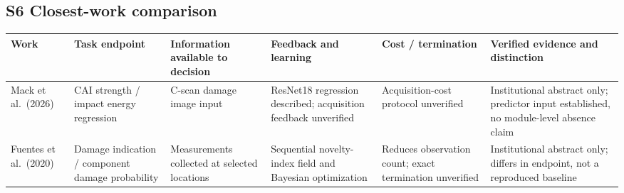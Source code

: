 \documentclass[11pt,a4paper]{article}
\begin{document}
\subsection{S6 Closest-work comparison}\label{s6-closest-work-comparison}

{ %
\begin{longtable}[]{@{}
  >{\raggedright\arraybackslash}p{}
  >{\raggedright\arraybackslash}p{}
  >{\raggedright\arraybackslash}p{}
  >{\raggedright\arraybackslash}p{}
  >{\raggedright\arraybackslash}p{}
  >{\raggedright\arraybackslash}p{}@{}}
\toprule\noalign{}
\begin{minipage}[b]{\linewidth}\raggedright
Work
\end{minipage} & \begin{minipage}[b]{\linewidth}\raggedright
Task endpoint
\end{minipage} & \begin{minipage}[b]{\linewidth}\raggedright
Information available to decision
\end{minipage} & \begin{minipage}[b]{\linewidth}\raggedright
Feedback and learning
\end{minipage} & \begin{minipage}[b]{\linewidth}\raggedright
Cost / termination
\end{minipage} & \begin{minipage}[b]{\linewidth}\raggedright
Verified evidence and distinction
\end{minipage} \\
\midrule\noalign{}
\endhead
\bottomrule\noalign{}
\endlastfoot
Mack et al.~(2026) & CAI strength / impact energy regression & C-scan damage image input & ResNet18 regression described; acquisition feedback unverified & Acquisition-cost protocol unverified & Institutional abstract only; predictor input established, no module-level absence claim \\
Fuentes et al.~(2020) & Damage indication / component damage probability & Measurements collected at selected locations & Sequential novelty-index field and Bayesian optimization & Reduces observation count; exact termination unverified & Institutional abstract only; differs in endpoint, not a reproduced baseline \\

\end{longtable}}
\end{document}
